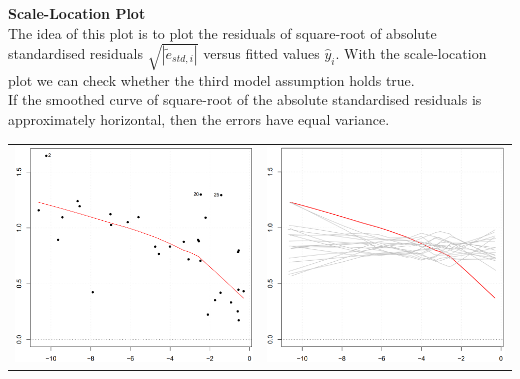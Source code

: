 \textbf{Scale-Location Plot}\\
The idea of this plot is to plot the residuals of square-root of absolute standardised residuals $\sqrt{|\tilde{e}_{std, i}|}$ versus fitted values $\hat{y}_i$. With the scale-location plot we can check whether the third model assumption holds true.\\
If the smoothed curve of square-root of the absolute standardised residuals is approximately horizontal, then the errors have equal variance.
\begin{table}[H]
  \setlength{\tabcolsep}{0.2em}
  \scriptsize
  \begin{tabular}{p{}@{\hskip 1em}p{}}
    \includegraphics[width=\linewidth]{Pics/8.2.7.png}& \includegraphics[width=\linewidth]{Pics/8.2.8.png} \\

\end{tabular}
\end{table}
